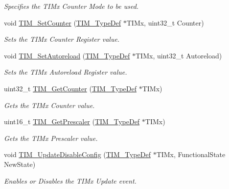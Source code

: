 \begin{DoxyCompactItemize}
\begin{DoxyCompactList}\small\item\em Specifies the T\+I\+Mx Counter Mode to be used. \end{DoxyCompactList}\item 
void \hyperlink{group___t_i_m___group1_ga18173e7955a85d5c2598c643eada2692}{T\+I\+M\+\_\+\+Set\+Counter} (\hyperlink{struct_t_i_m___type_def}{T\+I\+M\+\_\+\+Type\+Def} $\ast$T\+I\+Mx, uint32\+\_\+t Counter)
\begin{DoxyCompactList}\small\item\em Sets the T\+I\+Mx Counter Register value. \end{DoxyCompactList}\item 
void \hyperlink{group___t_i_m___group1_gad6a388d498c7f299d00a9d0871943041}{T\+I\+M\+\_\+\+Set\+Autoreload} (\hyperlink{struct_t_i_m___type_def}{T\+I\+M\+\_\+\+Type\+Def} $\ast$T\+I\+Mx, uint32\+\_\+t Autoreload)
\begin{DoxyCompactList}\small\item\em Sets the T\+I\+Mx Autoreload Register value. \end{DoxyCompactList}\item 
uint32\+\_\+t \hyperlink{group___t_i_m___group1_ga53607976e0866ab424e294cda9f6036e}{T\+I\+M\+\_\+\+Get\+Counter} (\hyperlink{struct_t_i_m___type_def}{T\+I\+M\+\_\+\+Type\+Def} $\ast$T\+I\+Mx)
\begin{DoxyCompactList}\small\item\em Gets the T\+I\+Mx Counter value. \end{DoxyCompactList}\item 
uint16\+\_\+t \hyperlink{group___t_i_m___group1_ga427eb6e533480e02a27cd0ca876183d6}{T\+I\+M\+\_\+\+Get\+Prescaler} (\hyperlink{struct_t_i_m___type_def}{T\+I\+M\+\_\+\+Type\+Def} $\ast$T\+I\+Mx)
\begin{DoxyCompactList}\small\item\em Gets the T\+I\+Mx Prescaler value. \end{DoxyCompactList}\item 
void \hyperlink{group___t_i_m___group1_gace2384dd33e849a054f61b8e1fc7e7c3}{T\+I\+M\+\_\+\+Update\+Disable\+Config} (\hyperlink{struct_t_i_m___type_def}{T\+I\+M\+\_\+\+Type\+Def} $\ast$T\+I\+Mx, Functional\+State New\+State)
\begin{DoxyCompactList}\small\item\em Enables or Disables the T\+I\+Mx Update event. \end{DoxyCompactList}\item 

\end{DoxyCompactItemize}
